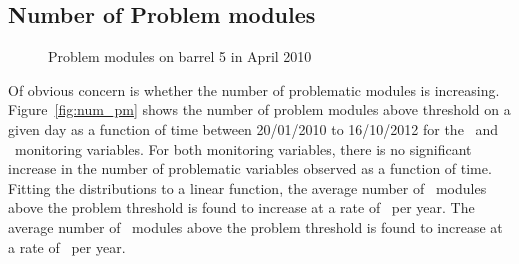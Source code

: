 \subsection{Number of Problem modules}

\begin{figure}
	\centering


	\caption{Problem modules on barrel 5 in April 2010}
	\label{fig:pm_april}
\end{figure}
 
Of obvious concern is whether the number of problematic modules is increasing.
Figure~\ref{fig:num_pm} shows the number of problem modules above threshold on a
given day as a function of time between 20/01/2010 to 16/10/2012 for the
\deltat\
and \tdiff\ monitoring variables. For both monitoring variables, there is no
significant increase in the number of problematic variables observed as a
function of time. Fitting the distributions to a linear function, the average
number of \tdiff\ modules above the problem threshold is found to increase at a rate
of \NumHighTdiffModulesIncreaseRate\ per year. The average number of \deltat\
modules above the problem threshold is found to increase at a rate of
\NumHighDeltaTModulesIncreaseRate\ per year.


